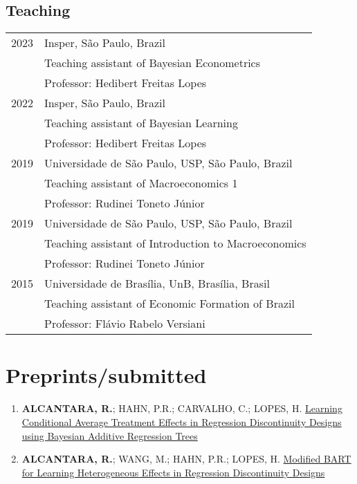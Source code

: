 \documentclass[10pt]{article}
\begin{document}
\subsection*{Teaching}
\label{sec:org3c7d8d1}
\begin{footnotesize}
  \begin{tabular}{ll}
    2023      & Insper, São Paulo, Brazil\\
	      & Teaching assistant of Bayesian Econometrics\\
	      & Professor: Hedibert Freitas Lopes\\
    2022      & Insper, São Paulo, Brazil\\
	      & Teaching assistant of Bayesian Learning\\
	      & Professor: Hedibert Freitas Lopes\\
    2019      & Universidade de São Paulo, USP, São Paulo, Brazil\\
	      & Teaching assistant of Macroeconomics 1\\
	      & Professor: Rudinei Toneto Júnior\\
    2019      & Universidade de São Paulo, USP, São Paulo, Brazil\\
	      & Teaching assistant of Introduction to Macroeconomics\\
	      & Professor: Rudinei Toneto Júnior\\
    2015      & Universidade de Brasília, UnB, Brasília, Brasil\\
	      & Teaching assistant of Economic Formation of Brazil\\
	      & Professor: Flávio Rabelo Versiani
  \end{tabular}
\end{footnotesize}

\section*{Preprints/submitted}
\label{sec:orgec47a03}
\begin{enumerate}
	\item \textbf{ALCANTARA, R.}; HAHN, P.R.; CARVALHO, C.; LOPES, H. \href{https://arxiv.org/abs/2503.00326}{Learning Conditional Average Treatment Effects in Regression Discontinuity Designs using Bayesian Additive Regression Trees}
	
	\item \textbf{ALCANTARA, R.}; WANG, M.; HAHN, P.R.; LOPES, H. \href{https://arxiv.org/abs/2407.14365}{Modified BART for Learning Heterogeneous Effects in Regression Discontinuity Designs}
\end{enumerate}
\end{document}
